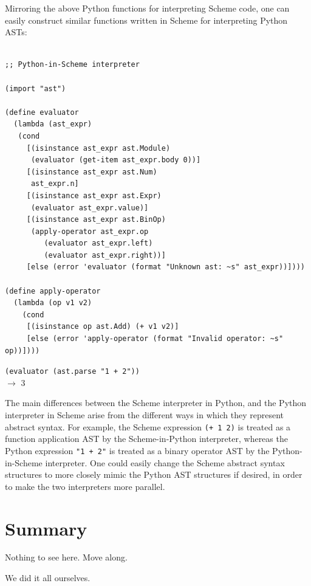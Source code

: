 \documentclass[acmsmall,screen,authorversion]{acmart}
\begin{document}
Mirroring the above Python functions for interpreting Scheme code, one can
easily construct similar functions written in Scheme for interpreting Python
ASTs:

\begin{minipage}{0.5\textwidth}
{\footnotesize
\begin{verbatim}

;; Python-in-Scheme interpreter

(import "ast")

(define evaluator
  (lambda (ast_expr)
   (cond
     [(isinstance ast_expr ast.Module)
      (evaluator (get-item ast_expr.body 0))]
     [(isinstance ast_expr ast.Num)
      ast_expr.n]
     [(isinstance ast_expr ast.Expr)
      (evaluator ast_expr.value)]
     [(isinstance ast_expr ast.BinOp)
      (apply-operator ast_expr.op
         (evaluator ast_expr.left)
         (evaluator ast_expr.right))]
     [else (error 'evaluator (format "Unknown ast: ~s" ast_expr))])))

(define apply-operator
  (lambda (op v1 v2)
    (cond
     [(isinstance op ast.Add) (+ v1 v2)]
     [else (error 'apply-operator (format "Invalid operator: ~s" op))])))

\end{verbatim}
\texttt{(evaluator (ast.parse "1 + 2"))}\\
$\rightarrow$ 3\\
}
\end{minipage}

\noindent
The main differences between the Scheme interpreter in Python, and the Python
interpreter in Scheme arise from the different ways in which they represent
abstract syntax.  For example, the Scheme expression \texttt{(+~1~2)} is
treated as a function application AST by the Scheme-in-Python interpreter,
whereas the Python expression \texttt{"1~+~2"} is treated as a binary operator
AST by the Python-in-Scheme interpreter.  One could easily change the Scheme
abstract syntax structures to more closely mimic the Python AST structures if
desired, in order to make the two interpreters more parallel.

\section{Summary}

Nothing to see here. Move along.

\begin{acks}
We did it all ourselves.
\end{acks}



\end{document}
